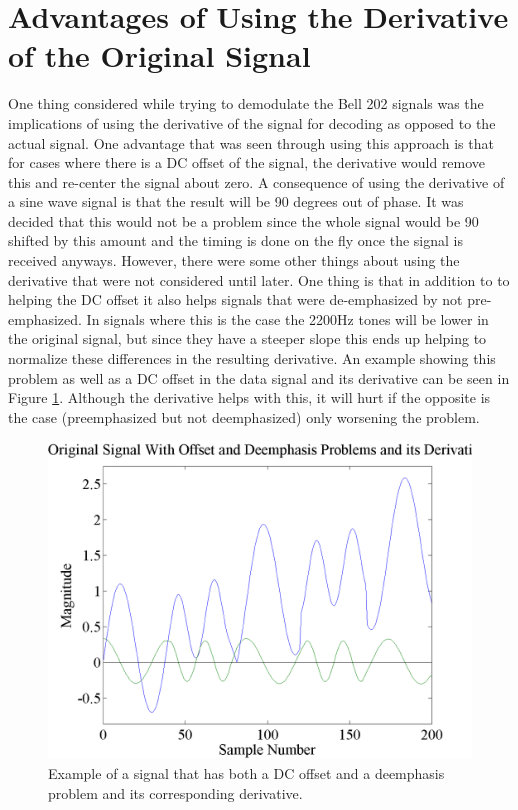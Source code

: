 \section{Advantages of Using the Derivative of the Original Signal}
One thing considered while trying to demodulate the Bell 202 signals was the implications of using the derivative of the signal for decoding as opposed to the actual signal. One advantage that was seen through using this approach is that for cases where there is a DC offset of the signal, the derivative would remove this and re-center the signal about zero. A consequence of using the derivative of a sine wave signal is that the result will be 90 degrees out of phase. It was decided that this would not be a problem since the whole signal would be 90 shifted by this amount and the timing is done on the fly once the signal is received anyways. However, there were some other things about using the derivative that were not considered until later. One thing is that in addition to to helping the DC offset it also helps signals that were de-emphasized by not pre-emphasized. In signals where this is the case the 2200Hz tones will be lower in the original signal, but since they have a steeper slope this ends up helping to normalize these differences in the resulting derivative. An example showing this problem as well as a DC offset in the data signal and its derivative can be seen in Figure \ref{emphasisAndDerivativeExample}. Although the derivative helps with this, it will hurt if the opposite is the case (preemphasized but not deemphasized) only worsening the problem.
\begin{figure}
  \centering
	\includegraphics[width=0.75\linewidth]{images/OriginalSignalWithOffsetandDeemphasisProblemsanditsDerivative.png} 
	\caption{Example of a signal that has both a DC offset and a deemphasis problem and its corresponding derivative.}
   \label{emphasisAndDerivativeExample}
\end{figure}

